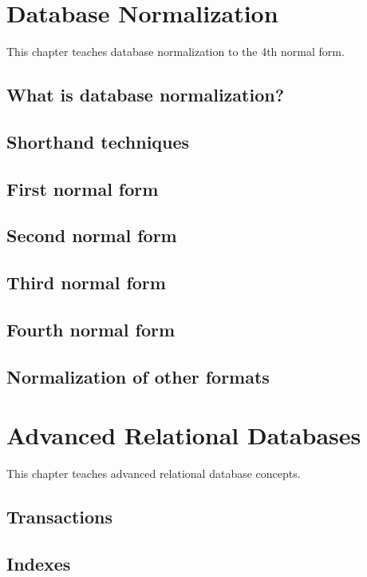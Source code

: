 \chapter{Database Normalization}
\label{chap:relational:database-normalization}
This chapter teaches database normalization to the 4th normal form.

\section{What is database normalization?}
\section{Shorthand techniques}
\section{First normal form}
\section{Second normal form}
\section{Third normal form}
\section{Fourth normal form}
\section{Normalization of other formats}

\chapter{Advanced Relational Databases}
\label{chap:relational:advanced-relational-databases}
This chapter teaches advanced relational database concepts.

\section{Transactions}
\section{Indexes}
